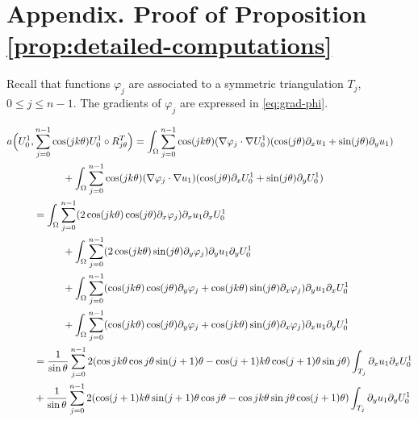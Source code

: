 \appendix

\section*{Appendix. Proof of Proposition \ref{prop:detailed-computations}}
\label{appendix:computations}

Recall that functions $\varphi_j$ are associated to a symmetric triangulation $T_j$, $0 \leq j \leq n-1$. The gradients of $\varphi_j$ are expressed in \eqref{eq:grad-phi}.

\vspace*{-1\baselineskip}
\bgroup\smaller
\begin{align*}
a\Bigl(U_0^1,&\sum_{j=0}^{n-1} \cos(jk\theta) U_0^1 \circ R_{j\theta}^T\Bigr) = \int_\Omega \sum_{j=0}^{n-1} \cos(jk\theta)(\nabla \varphi_j\cdot \nabla U_0^1)(\cos(j\theta) \partial_x u_1+\sin (j\theta)\partial_y u_1) \\
&\hspace*{1cm}+ \int_\Omega \sum_{j=0}^{n-1}\cos(jk\theta) (\nabla \varphi_j\cdot \nabla u_1)(\cos(j\theta) \partial_x U_0^1 +\sin(j\theta) \partial_y U_0^1) \\
&= \int_\Omega \sum_{j=0}^{n-1} (2 \cos(jk\theta)\cos(j\theta)\partial_x \varphi_j) \partial_x u_1 \partial_x U_0^1 \\
&\hspace*{1cm}+ \int_\Omega \sum_{j=0}^{n-1}(2\cos(jk\theta)\sin(j\theta)\partial_y \varphi_j) \partial_y u_1 \partial_y U_0^1 \\
&\hspace*{1cm}+ \int_\Omega \sum_{j=0}^{n-1} (\cos(jk\theta)\cos(j\theta)\partial_y \varphi_j+\cos(jk\theta)\sin(j\theta)\partial_x \varphi_j) \partial_y u_1 \partial_x U_0^1 \\
&\hspace*{1cm}+ \int_\Omega \sum_{j=0}^{n-1} (\cos(jk\theta)\cos(j\theta)\partial_y \varphi_j+\cos(jk\theta)\sin(j\theta)\partial_x \varphi_j) \partial_x u_1 \partial_y U_0^1\\
&=\frac{1}{\sin \theta}\sum_{j=0}^{n-1}2 (\cos jk\theta \cos j \theta \sin(j+1)\theta -\cos(j+1)k\theta \cos (j+1)\theta \sin j\theta) \int_{T_j} \partial_x u_1 \partial_x U_0^1
\\
&+\frac{1}{\sin \theta}\sum_{j=0}^{n-1} 2(\cos(j+1)k\theta \sin(j+1)\theta \cos j \theta-\cos jk\theta \sin j \theta \cos(j+1)\theta)\int_{T_j} \partial_y u_1 \partial_y U_0^1
\\

\end{align*}
